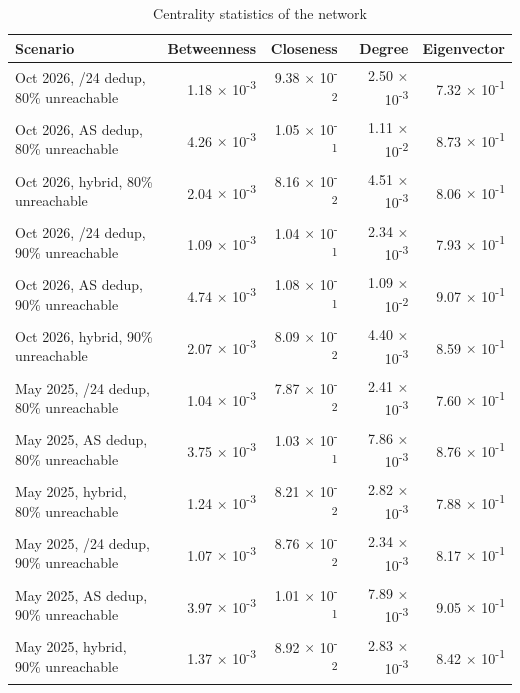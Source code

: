 \begingroup
\begin{longtable}{lrrrr}
\caption{
{\fontsize{20}{25}\selectfont  Centrality statistics of the network}
} \\ 
\toprule
Scenario & Betweenness & Closeness & Degree & Eigenvector \\ 
\midrule\addlinespace[2.5pt]
Oct 2026, /24 dedup, 80\% unreachable & 1.18 $\times$ 10\textsuperscript{-3} & 9.38 $\times$ 10\textsuperscript{-2} & 2.50 $\times$ 10\textsuperscript{-3} & 7.32 $\times$ 10\textsuperscript{-1} \\ 
Oct 2026, AS dedup, 80\% unreachable & 4.26 $\times$ 10\textsuperscript{-3} & 1.05 $\times$ 10\textsuperscript{-1} & 1.11 $\times$ 10\textsuperscript{-2} & 8.73 $\times$ 10\textsuperscript{-1} \\ 
Oct 2026, hybrid, 80\% unreachable & 2.04 $\times$ 10\textsuperscript{-3} & 8.16 $\times$ 10\textsuperscript{-2} & 4.51 $\times$ 10\textsuperscript{-3} & 8.06 $\times$ 10\textsuperscript{-1} \\ 
Oct 2026, /24 dedup, 90\% unreachable & 1.09 $\times$ 10\textsuperscript{-3} & 1.04 $\times$ 10\textsuperscript{-1} & 2.34 $\times$ 10\textsuperscript{-3} & 7.93 $\times$ 10\textsuperscript{-1} \\ 
Oct 2026, AS dedup, 90\% unreachable & 4.74 $\times$ 10\textsuperscript{-3} & 1.08 $\times$ 10\textsuperscript{-1} & 1.09 $\times$ 10\textsuperscript{-2} & 9.07 $\times$ 10\textsuperscript{-1} \\ 
Oct 2026, hybrid, 90\% unreachable & 2.07 $\times$ 10\textsuperscript{-3} & 8.09 $\times$ 10\textsuperscript{-2} & 4.40 $\times$ 10\textsuperscript{-3} & 8.59 $\times$ 10\textsuperscript{-1} \\ 
May 2025, /24 dedup, 80\% unreachable & 1.04 $\times$ 10\textsuperscript{-3} & 7.87 $\times$ 10\textsuperscript{-2} & 2.41 $\times$ 10\textsuperscript{-3} & 7.60 $\times$ 10\textsuperscript{-1} \\ 
May 2025, AS dedup, 80\% unreachable & 3.75 $\times$ 10\textsuperscript{-3} & 1.03 $\times$ 10\textsuperscript{-1} & 7.86 $\times$ 10\textsuperscript{-3} & 8.76 $\times$ 10\textsuperscript{-1} \\ 
May 2025, hybrid, 80\% unreachable & 1.24 $\times$ 10\textsuperscript{-3} & 8.21 $\times$ 10\textsuperscript{-2} & 2.82 $\times$ 10\textsuperscript{-3} & 7.88 $\times$ 10\textsuperscript{-1} \\ 
May 2025, /24 dedup, 90\% unreachable & 1.07 $\times$ 10\textsuperscript{-3} & 8.76 $\times$ 10\textsuperscript{-2} & 2.34 $\times$ 10\textsuperscript{-3} & 8.17 $\times$ 10\textsuperscript{-1} \\ 
May 2025, AS dedup, 90\% unreachable & 3.97 $\times$ 10\textsuperscript{-3} & 1.01 $\times$ 10\textsuperscript{-1} & 7.89 $\times$ 10\textsuperscript{-3} & 9.05 $\times$ 10\textsuperscript{-1} \\ 
May 2025, hybrid, 90\% unreachable & 1.37 $\times$ 10\textsuperscript{-3} & 8.92 $\times$ 10\textsuperscript{-2} & 2.83 $\times$ 10\textsuperscript{-3} & 8.42 $\times$ 10\textsuperscript{-1} \\ 
\bottomrule
\end{longtable}
\endgroup
